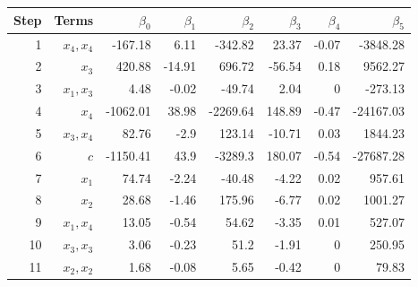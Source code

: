 \begin{tabular}{rrrrrrrr}
Step & Terms & $\beta_{0}$ & $\beta_{1}$ & $\beta_{2}$ & $\beta_{3}$ & $\beta_{4}$ & $\beta_{5}$ \\ 
\hline 
1 & $x_4,x_4$ & -167.18 & 6.11 & -342.82 & 23.37 & -0.07 & -3848.28 \\ 
2 & $x_3$ & 420.88 & -14.91 & 696.72 & -56.54 & 0.18 & 9562.27 \\ 
3 & $x_1,x_3$ & 4.48 & -0.02 & -49.74 & 2.04 & 0 & -273.13 \\ 
4 & $x_4$ & -1062.01 & 38.98 & -2269.64 & 148.89 & -0.47 & -24167.03 \\ 
5 & $x_3,x_4$ & 82.76 & -2.9 & 123.14 & -10.71 & 0.03 & 1844.23 \\ 
6 & $c$ & -1150.41 & 43.9 & -3289.3 & 180.07 & -0.54 & -27687.28 \\ 
7 & $x_1$ & 74.74 & -2.24 & -40.48 & -4.22 & 0.02 & 957.61 \\ 
8 & $x_2$ & 28.68 & -1.46 & 175.96 & -6.77 & 0.02 & 1001.27 \\ 
9 & $x_1,x_4$ & 13.05 & -0.54 & 54.62 & -3.35 & 0.01 & 527.07 \\ 
10 & $x_3,x_3$ & 3.06 & -0.23 & 51.2 & -1.91 & 0 & 250.95 \\ 
11 & $x_2,x_2$ & 1.68 & -0.08 & 5.65 & -0.42 & 0 & 79.83 \\ 
\hline 
\end{tabular}